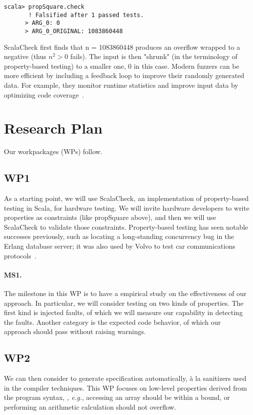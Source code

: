 \documentclass[fleqn,12pt]{article}
\begin{document}
\begin{lstlisting}[numbers=none]
scala> propSquare.check
       ! Falsified after 1 passed tests.
      > ARG_0: 0
      > ARG_0_ORIGINAL: 1083860448
\end{lstlisting}
 ScalaCheck first finds that n = 1083860448 produces an overflow
 wrapped to a negative (thus $n^2>0$ fails). The input is then
 "shrunk" (in the terminology of property-based testing) to a smaller
 one, 0 in this case.  Modern fuzzers can be more efficient by
 including a feedback loop to improve their randomly generated
 data. For example, they monitor runtime statistics and improve input
 data by optimizing code
 coverage~\cite{DBLP:journals/tse/BohmePR19,DBLP:conf/pldi/FuS17}.






\section{Research Plan}


Our workpackages (WPs) follow.
\subsection{WP1} 
As a starting point, we will use ScalaCheck, an implementation of
property-based testing in Scala, for hardware testing. We will invite
hardware developers to write properties as constraints (like
propSquare above), and then we will use ScalaCheck to validate those
constraints. Property-based testing has seen notable
successes previously, such as locating a long-standing concurrency bug
in the Erlang database server; it was also used by Volvo to test car
communications protocols~\cite{DBLP:conf/icse/HughesNSA16}.

\paragraph{MS1.} The milestone in this WP is to have a empirical study on the effectiveness of our approach. In particular,  we will consider testing on two kinds of properties. The first kind is injected faults, of which we will measure our capability in detecting the faults. Another category is the expected code behavior, of which our approach should  pass without raising  warnings. 

\subsection{WP2} 
We can then consider to generate specification automatically, \`a la
sanitizers used in the compiler techniques. This WP focuses on
low-level properties derived from the program syntax, {\em, e.g.},
accessing an array should be within a bound, or performing an
arithmetic calculation should not overflow.
\end{document}
